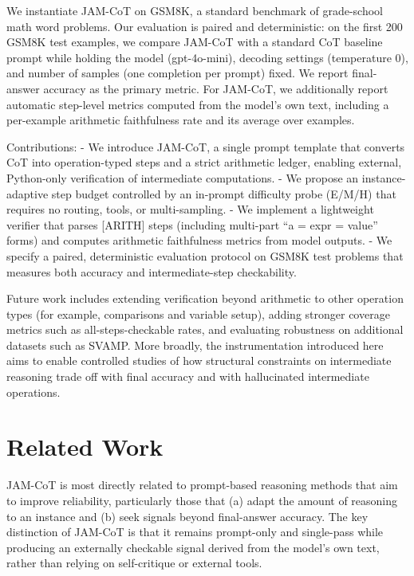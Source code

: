 \documentclass[journal,article,submit,pdftex,moreauthors]{Definitions/mdpi}
\begin{document}
We instantiate JAM-CoT on GSM8K, a standard benchmark of grade-school math word problems. Our evaluation is paired and deterministic: on the first 200 GSM8K test examples, we compare JAM-CoT with a standard CoT baseline prompt while holding the model (gpt-4o-mini), decoding settings (temperature 0), and number of samples (one completion per prompt) fixed. We report final-answer accuracy as the primary metric. For JAM-CoT, we additionally report automatic step-level metrics computed from the model’s own text, including a per-example arithmetic faithfulness rate and its average over examples.

Contributions:
- We introduce JAM-CoT, a single prompt template that converts CoT into operation-typed steps and a strict arithmetic ledger, enabling external, Python-only verification of intermediate computations.
- We propose an instance-adaptive step budget controlled by an in-prompt difficulty probe (E/M/H) that requires no routing, tools, or multi-sampling.
- We implement a lightweight verifier that parses [ARITH] steps (including multi-part “a = expr = value” forms) and computes arithmetic faithfulness metrics from model outputs.
- We specify a paired, deterministic evaluation protocol on GSM8K test problems that measures both accuracy and intermediate-step checkability.

Future work includes extending verification beyond arithmetic to other operation types (for example, comparisons and variable setup), adding stronger coverage metrics such as all-steps-checkable rates, and evaluating robustness on additional datasets such as SVAMP. More broadly, the instrumentation introduced here aims to enable controlled studies of how structural constraints on intermediate reasoning trade off with final accuracy and with hallucinated intermediate operations.

\section{Related Work}

JAM-CoT is most directly related to prompt-based reasoning methods that aim to improve reliability, particularly those that (a) adapt the amount of reasoning to an instance and (b) seek signals beyond final-answer accuracy. The key distinction of JAM-CoT is that it remains prompt-only and single-pass while producing an externally checkable signal derived from the model’s own text, rather than relying on self-critique or external tools.
\end{document}
